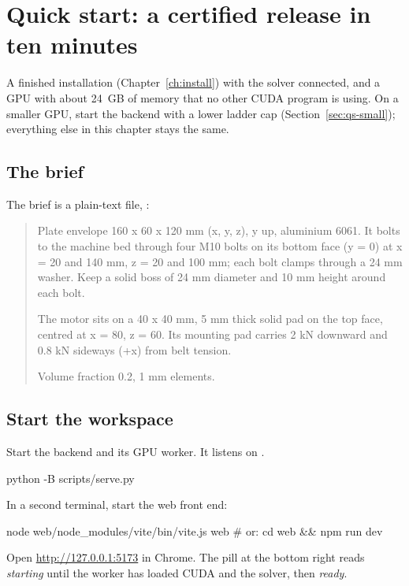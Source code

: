 \chapter{Quick start: a certified release in ten minutes}\label{ch:quickstart}

\begin{notebox}
A finished installation (Chapter~\ref{ch:install}) with the solver connected, and a GPU with about 24~GB of memory
that no other CUDA program is using. On a smaller GPU, start the backend with a lower ladder cap
(Section~\ref{sec:qs-small}); everything else in this chapter stays the same.
\end{notebox}

\section{The brief}
The brief is a plain-text file, :

\begin{quote}\small\sffamily
Plate envelope 160 x 60 x 120 mm (x, y, z), y up, aluminium 6061. It bolts to the machine bed through four M10 bolts on
its bottom face (y = 0) at x = 20 and 140 mm, z = 20 and 100 mm; each bolt clamps through a 24 mm washer. Keep a solid
boss of 24 mm diameter and 10 mm height around each bolt.

The motor sits on a 40 x 40 mm, 5 mm thick solid pad on the top face, centred at x = 80, z = 60. Its mounting pad
carries 2 kN downward and 0.8 kN sideways (+x) from belt tension.

Volume fraction 0.2, 1 mm elements.
\end{quote}

\section{Start the workspace}
\begin{steps}
\item Start the backend and its GPU worker. It listens on .
\begin{shell}
python -B scripts/serve.py
\end{shell}
\item In a second terminal, start the web front end:
\begin{shell}
node web/node_modules/vite/bin/vite.js web     # or: cd web && npm run dev
\end{shell}
\item Open \url{http://127.0.0.1:5173} in Chrome. The  pill at the bottom right reads \emph{starting} until the
worker has loaded CUDA and the solver, then \emph{ready}.
\end{steps}

